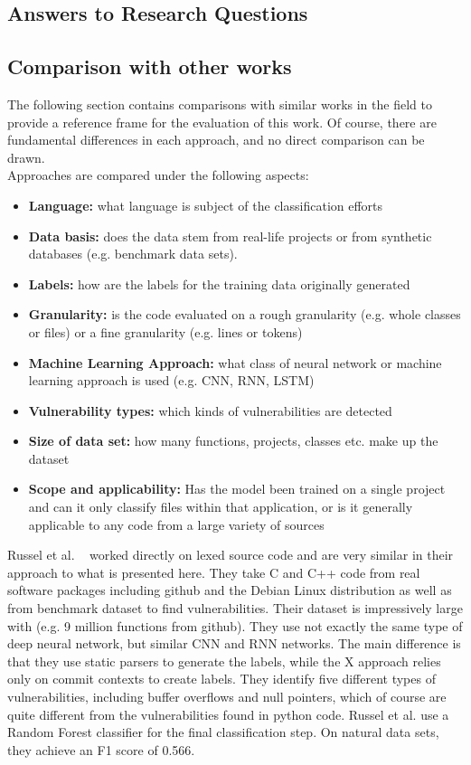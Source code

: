 \documentclass[
	a4paper,
	pagesize,
	pdftex,
	12pt,
	twoside, %
	BCOR=5mm, %
	ngerman,
	fleqn,
	final,
	]{scrartcl}
\begin{document}
\subsection{Answers to Research Questions}


\subsection{Comparison with other works}

The following section contains comparisons with similar works in the field to provide a reference frame for the evaluation of this work. Of course, there are fundamental differences in each approach, and no direct comparison can be drawn.\\
Approaches are compared under the following aspects:\\
\begin{itemize}
	\item \textbf{Language:} what language is subject of the classification efforts
	\item \textbf{Data basis:} does the data stem from real-life projects or from synthetic databases (e.g. benchmark data sets).
	\item \textbf{Labels:} how are the labels for the training data originally generated
	\item \textbf{Granularity:} is the code evaluated on a rough granularity (e.g. whole classes or files) or a fine granularity (e.g. lines or tokens)
	\item \textbf{Machine Learning Approach:} what class of neural network or machine learning approach is used (e.g. CNN, RNN, LSTM)
	\item \textbf{Vulnerability types:} which kinds of vulnerabilities are detected
	\item \textbf{Size of data set:} how many functions, projects, classes etc. make up the dataset
	\item \textbf{Scope and applicability:} Has the model been trained on a single project and can it only classify files within that application, or is it generally applicable to any code from a large variety of sources
\end{itemize}


Russel et al. ~\cite{Russell.2018} worked directly on lexed source code and are very similar in their approach to what is presented here. They take C and C++ code from real software packages including github and the Debian Linux distribution as well as from benchmark dataset to find vulnerabilities. Their dataset is impressively large with (e.g. 9 million functions from github). They use not exactly the same type of deep neural network, but similar CNN and RNN networks. The main difference is that they use static parsers to generate the labels, while the X approach relies only on commit contexts to create labels. They identify five different types of vulnerabilities, including buffer overflows and null pointers, which of course are quite different from the vulnerabilities found in python code. Russel et al. use a Random Forest classifier for the final classification step. On natural data sets, they achieve an F1 score of 0.566.\\
\end{document}

